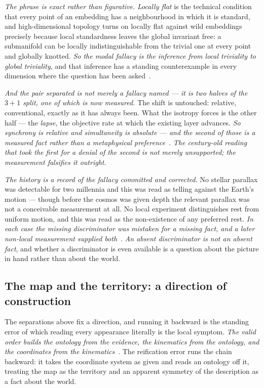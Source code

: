 \documentclass[11pt,a4paper]{article}
\theoremstyle{plain}
\theoremstyle{definition}
\begin{document}
\emph{The phrase is exact rather than figurative.} \emph{Locally flat} is the technical condition that every
point of an embedding has a neighbourhood in which it is standard, and high-dimensional topology turns on
locally flat against wild embeddings precisely because local standardness leaves the global invariant free: a
submanifold can be locally indistinguishable from the trivial one at every point and globally knotted.
\emph{So the modal fallacy is the inference from local triviality to global triviality}, and that inference
has a standing counterexample in every dimension where the question has been
asked~\cite{JanzenShadowExistence}.

\emph{And the pair separated is not merely a fallacy named --- it is two halves of the $3+1$ split, one of
which is now measured.} The shift is untouched: relative, conventional, exactly as it has always been. What
the isotropy forces is the other half --- the \emph{lapse}, the objective rate at which the existing layer
advances. \emph{So
synchrony is relative and simultaneity is absolute --- and the second of those is a measured fact rather than
a metaphysical preference}~\cite{JanzenModernParallax}. \emph{The century-old reading that took the first for
a denial of the second is not merely unsupported; the measurement falsifies it outright.}

\emph{The history is a record of the fallacy committed and corrected.} No stellar parallax was detectable for
two millennia and this was read as telling against the Earth's motion --- though before the cosmos was given
depth the relevant parallax was not a conceivable measurement at all. No local experiment distinguishes rest
from uniform motion, and this was read as the non-existence of any preferred rest. \emph{In each case the
missing discriminator was mistaken for a missing fact, and a later non-local measurement supplied
both}~\cite{JanzenShadowExistence}. \emph{An absent discriminator is not an absent fact}, and whether a
discriminator is even available is a question about the picture in hand rather than about the world.

\subsection{The map and the territory: a direction of construction}

The separations above fix a direction, and running it backward is the standing error of which reading every
appearance literally is the local symptom. \emph{The valid order builds the ontology from the evidence, the
kinematics from the ontology, and the coordinates from the kinematics}~\cite{JanzenShadowExistence}. The
reification error runs the chain backward: it takes the coordinate system as given and reads an ontology off
it, treating the map as the territory and an apparent symmetry of the description as a fact about the world.
\end{document}
